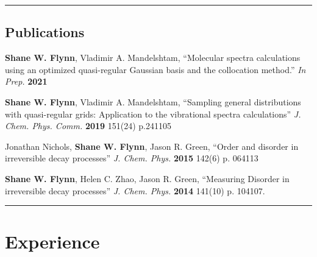 \documentclass[letterpaper]{article}
\renewenvironment{itemize}{
  \begin{list}{}{
    \setlength{\leftmargin}{1.5em}
  }
}{
  \end{list}
}
\begin{document}
\vspace{0.1in}
\hrule
\subsection*{Publications}

\begin{itemize}
\item \textbf{Shane W. Flynn}, Vladimir A. Mandelshtam,
      ``Molecular spectra calculations using an optimized quasi-regular Gaussian 
        basis and the collocation method.'' \textit{In Prep.}
      \textbf{2021} 

\item \textbf{Shane W. Flynn}, Vladimir A. Mandelshtam,
      ``Sampling general distributions with quasi-regular grids: Application to
      the vibrational spectra calculations'' \textit{J. Chem. Phys. Comm.}
      \textbf{2019} 151(24) p.241105

\item Jonathan Nichols, \textbf{Shane W. Flynn}, Jason R. Green,
      ``Order and disorder in irreversible decay processes''
      \textit{J. Chem. Phys.} \textbf{2015} 142(6) p. 064113

\item \textbf{Shane W. Flynn}, Helen C. Zhao, Jason R. Green,
      ``Measuring Disorder in irreversible decay processes''
      \textit{J. Chem. Phys.} \textbf{2014} 141(10) p. 104107.
\end{itemize}

\vspace{0.1in}
\hrule

\section*{Experience}
\end{document}

